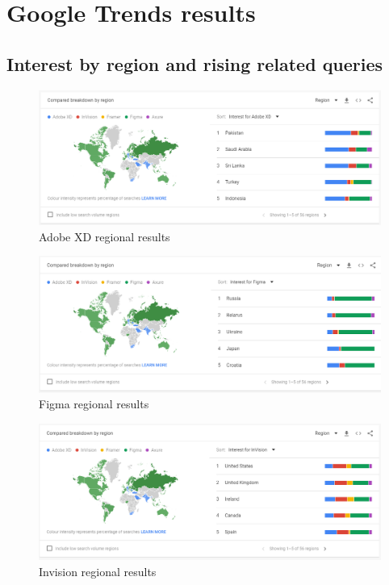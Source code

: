 \chapter{Google Trends results}\label{app:google-trends}

\section{Interest by region and rising related queries }
    \begin{figure}[H]
        \centering
        \includegraphics[scale=0.4]{figures/trends/adobe-xd-region.png}
        \caption{Adobe XD regional results}
        \label{app:google-trends-region-adobe-xd}
    \end{figure}
   
    \begin{figure}[H]
        \centering
        \includegraphics[scale=0.4]{figures/trends/figma-region.png}
        \caption{Figma regional results}
        \label{app:google-trends-region-figma}
    \end{figure}
   
    \begin{figure}[H]
            \centering
            \includegraphics[scale=0.4]{figures/trends/invision-region.png}
            \caption{Invision regional results}
            \label{app:google-trends-region-invision}
    \end{figure}


